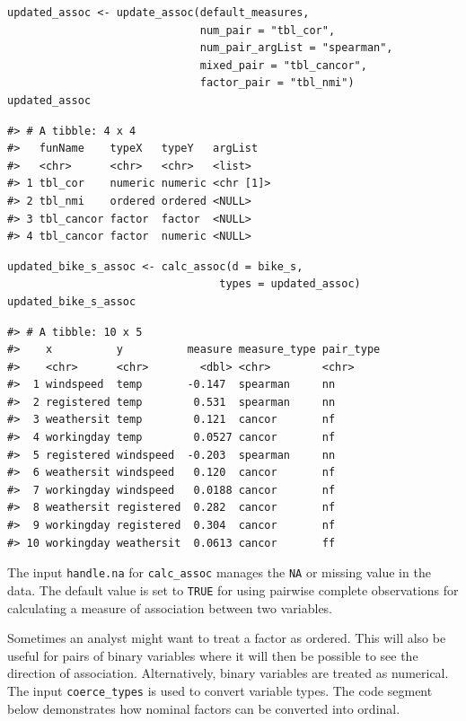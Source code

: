 \begin{verbatim}
updated_assoc <- update_assoc(default_measures,
                              num_pair = "tbl_cor",
                              num_pair_argList = "spearman",
                              mixed_pair = "tbl_cancor",
                              factor_pair = "tbl_nmi")
updated_assoc
\end{verbatim}

\begin{verbatim}
#> # A tibble: 4 x 4
#>   funName    typeX   typeY   argList  
#>   <chr>      <chr>   <chr>   <list>   
#> 1 tbl_cor    numeric numeric <chr [1]>
#> 2 tbl_nmi    ordered ordered <NULL>   
#> 3 tbl_cancor factor  factor  <NULL>   
#> 4 tbl_cancor factor  numeric <NULL>
\end{verbatim}

\begin{verbatim}
updated_bike_s_assoc <- calc_assoc(d = bike_s, 
                                 types = updated_assoc)
updated_bike_s_assoc
\end{verbatim}

\begin{verbatim}
#> # A tibble: 10 x 5
#>    x          y          measure measure_type pair_type
#>    <chr>      <chr>        <dbl> <chr>        <chr>    
#>  1 windspeed  temp       -0.147  spearman     nn       
#>  2 registered temp        0.531  spearman     nn       
#>  3 weathersit temp        0.121  cancor       nf       
#>  4 workingday temp        0.0527 cancor       nf       
#>  5 registered windspeed  -0.203  spearman     nn       
#>  6 weathersit windspeed   0.120  cancor       nf       
#>  7 workingday windspeed   0.0188 cancor       nf       
#>  8 weathersit registered  0.282  cancor       nf       
#>  9 workingday registered  0.304  cancor       nf       
#> 10 workingday weathersit  0.0613 cancor       ff
\end{verbatim}

The input \texttt{handle.na} for \texttt{calc\_assoc} manages the \texttt{NA} or missing value in the data. The default value is set to \texttt{TRUE} for using pairwise complete observations for calculating a measure of association between two variables.

Sometimes an analyst might want to treat a factor as ordered. This will also be useful for pairs of binary variables where it will then be possible to see the direction of association. Alternatively, binary variables are treated as numerical. The input \texttt{coerce\_types} is used to convert variable types. The code segment below demonstrates how nominal factors can be converted into ordinal.

